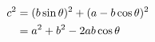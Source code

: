 \documentclass[preview]{standalone}
\begin{document}
\begin{align*}
\special{dvisvgm:raw <g id='unique000'>}c^2 &= (b\sin\theta)^2 + (a - b\cos\theta)^2 \\ \special{dvisvgm:raw </g>}\special{dvisvgm:raw <g id='unique001'>}&= a^2 + b^2 - 2ab\cos\theta\special{dvisvgm:raw </g>}
\end{align*}
\end{document}

